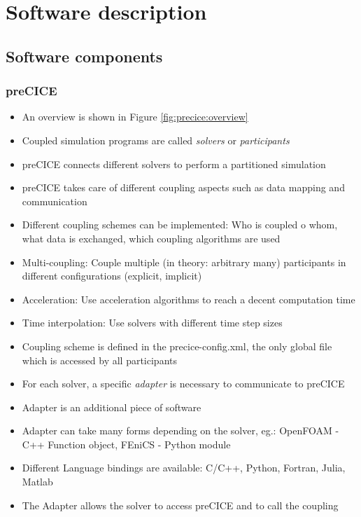 \section{Software description}

\subsection{Software components}

\subsubsection{preCICE}
\begin{itemize}
	\item An overview is shown in Figure \ref{fig:precice:overview}
	\item Coupled simulation programs are called \textit{solvers} or \textit{participants}
	\item preCICE connects different solvers to perform a partitioned simulation
	\item preCICE takes care of different coupling aspects such as data mapping and communication
	\item Different coupling schemes can be implemented: Who is coupled o whom, what data is exchanged, which coupling algorithms are used \cite{Gatzhammer:2014}
	\item Multi-coupling: Couple multiple (in theory: arbitrary many) participants in different configurations (explicit, implicit)
	\item Acceleration: Use acceleration algorithms to reach a decent computation time
	\item Time interpolation: Use solvers with different time step sizes
	\item Coupling scheme is defined in the precice-config.xml, the only global file which is accessed by all participants
	\item For each solver, a specific \textit{adapter} is necessary to communicate to preCICE
	\item Adapter is an additional piece of software
	\item Adapter can take many forms depending on the solver, eg.: OpenFOAM - C++ Function object, FEniCS - Python module
	\item Different Language bindings are available: C/C++, Python, Fortran, Julia, Matlab
	\item The Adapter allows the solver to access preCICE and to call the coupling
\end{itemize}

